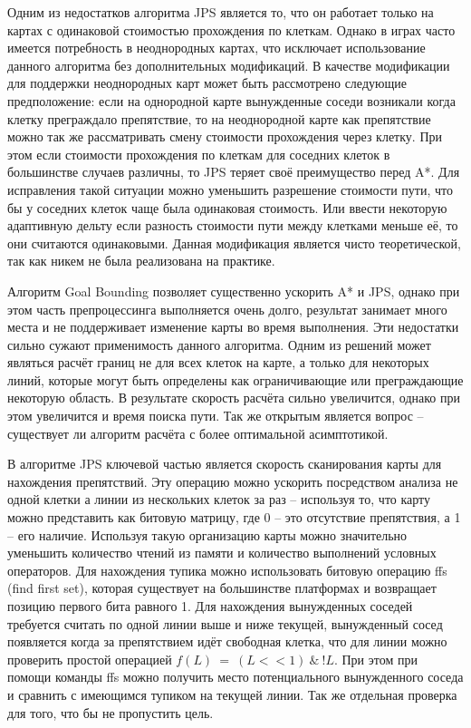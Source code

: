 Одним из недостатков алгоритма JPS является то, что он работает только на картах с одинаковой стоимостью прохождения по клеткам. Однако в играх часто имеется потребность в неоднородных картах, что исключает использование данного алгоритма без дополнительных модификаций. В качестве модификации для поддержки неоднородных карт может быть рассмотрено следующие предположение: если на однородной карте вынужденные соседи возникали когда клетку преграждало препятствие, то на неоднородной карте как препятствие можно так же рассматривать смену стоимости прохождения через клетку. При этом если стоимости прохождения по клеткам для соседних клеток в большинстве случаев различны, то JPS теряет своё преимущество перед A*. Для исправления такой ситуации можно уменьшить разрешение стоимости пути, что бы у соседних клеток чаще была одинаковая стоимость. Или ввести некоторую адаптивную дельту если разность стоимости пути между клетками меньше её, то они считаются одинаковыми. Данная модификация является чисто теоретической, так как никем не была реализована на практике.

Алгоритм Goal Bounding позволяет существенно ускорить A* и JPS, однако при этом часть препроцессинга выполняется очень долго, результат занимает много места и не поддерживает изменение карты во время выполнения. Эти недостатки сильно сужают применимость данного алгоритма. Одним из решений может являться расчёт границ не для всех клеток на карте, а только для некоторых линий, которые могут быть определены как ограничивающие или преграждающие некоторую область. В результате скорость расчёта сильно увеличится, однако при этом увеличится и время поиска пути. Так же открытым является вопрос -- существует ли алгоритм расчёта с более оптимальной асимптотикой.

В алгоритме JPS ключевой частью является скорость сканирования карты для нахождения препятствий. Эту операцию можно ускорить посредством анализа не одной клетки а линии из нескольких клеток за раз -- используя то, что карту можно представить как битовую матрицу, где 0 -- это отсутствие препятствия, а 1 -- его наличие. Используя такую организацию карты можно значительно уменьшить количество чтений из памяти и количество выполнений условных операторов. Для нахождения тупика можно использовать битовую операцию ffs (find first set), которая существует на большинстве платформах и возвращает позицию первого бита равного 1. Для нахождения вынужденных соседей требуется считать по одной линии выше и ниже текущей, вынужденный сосед появляется когда за препятствием идёт свободная клетка, что для линии можно проверить простой операцией $f(L)\ =\ (L<<1)\ \&\ !L$. При этом при помощи команды ffs можно получить место потенциального вынужденного соседа и сравнить с имеющимся тупиком на текущей линии. Так же отдельная проверка для того, что бы не пропустить цель.

